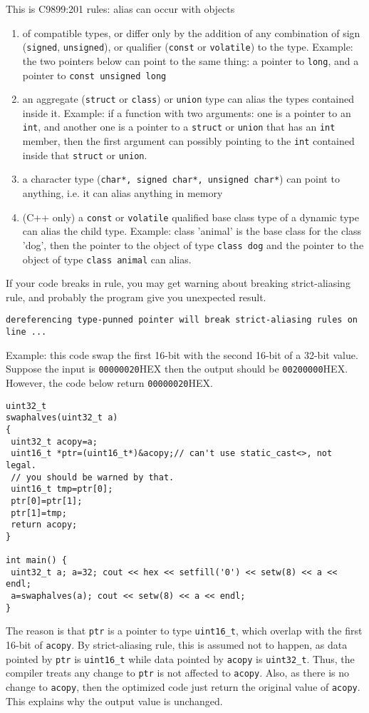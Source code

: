 This is C9899:201 rules: alias can occur with objects 
\begin{enumerate}
  \item of compatible types, or differ only by the addition of any combination
  of sign (\verb!signed!, \verb!unsigned!), or qualifier (\verb!const! or
  \verb!volatile!) to the type. Example: the two pointers below can point to the
  same thing: a pointer to \verb!long!, and a pointer to \verb!const unsigned long!
  
  \item an aggregate (\verb!struct! or \verb!class!) or \verb!union! type can
  alias the types contained inside it. Example: if a function with two
  arguments: one is a pointer to an \verb!int!, and another one is a pointer to
  a \verb!struct! or \verb!union! that has an \verb!int! member, then the
  first argument can possibly pointing to the \verb!int! contained inside
  that \verb!struct! or \verb!union!.
  
  \item a character type (\verb!char*, signed char*, unsigned char*!) can point
  to anything, i.e. it can alias anything in memory
  
  \item (C++ only) a \verb!const! or \verb!volatile! qualified base class type
  of a dynamic type can alias the child type. Example: class 'animal' is the
  base class for the class 'dog', then the pointer to the object of type
  \verb!class dog! and the pointer to the object of type \verb!class animal! can
  alias. 
\end{enumerate}
If your code breaks in rule, you may get warning about breaking strict-aliasing
rule, and probably the program give you unexpected result. 
\begin{verbatim}
dereferencing type-punned pointer will break strict-aliasing rules on line ...
\end{verbatim}

Example: this code swap the first 16-bit with the second 16-bit of a 32-bit
value. Suppose the input is \verb!00000020!HEX then the output should be 
\verb!00200000!HEX. However, the code below return \verb!00000020!HEX.
 
\begin{Verbatim}
uint32_t
swaphalves(uint32_t a)
{
 uint32_t acopy=a;
 uint16_t *ptr=(uint16_t*)&acopy;// can't use static_cast<>, not legal.
 // you should be warned by that.
 uint16_t tmp=ptr[0];
 ptr[0]=ptr[1];
 ptr[1]=tmp;
 return acopy;
}

int main() {
 uint32_t a; a=32; cout << hex << setfill('0') << setw(8) << a << endl;
 a=swaphalves(a); cout << setw(8) << a << endl;
}
\end{Verbatim} 
The reason is that \verb!ptr! is a pointer to type \verb!uint16_t!, which
overlap with the first 16-bit of \verb!acopy!. By strict-aliasing rule, this is
assumed not to happen, as data pointed by \verb!ptr! is \verb!uint16_t! while
data pointed by \verb!acopy! is \verb!uint32_t!.  Thus, the compiler treats any
change to \verb!ptr! is not affected to \verb!acopy!. Also, as there is no
change to \verb!acopy!, then the optimized code just return the original
value of \verb!acopy!. This explains why the output value is unchanged. 

